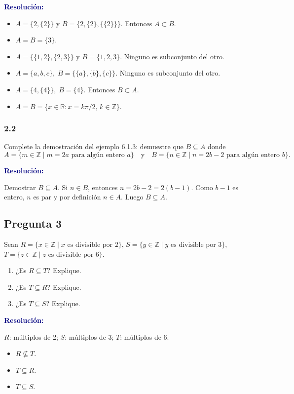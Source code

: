 \documentclass[12pt,a4paper]{article}
\newcommand{\resolucion}{\par\noindent\textbf{\textcolor{navy}{Resolución:}}\par}
\begin{document}
\resolucion
\begin{itemize}[leftmargin=1.2em]
  \item[a)] $A=\{2,\{2\}\}$ y $B=\{2,\{2\},\{\{2\}\}\}$. Entonces $A \subset B$.
  \item[b)] $A=B=\{3\}$.
  \item[c)] $A=\{\{1,2\},\{2,3\}\}$ y $B=\{1,2,3\}$. Ninguno es subconjunto del otro.
  \item[d)] $A=\{a,b,c\},\; B=\{\{a\},\{b\},\{c\}\}$. Ninguno es subconjunto del otro.
  \item[e)] $A=\{4,\{4\}\},\; B=\{4\}$. Entonces $B \subset A$.
  \item[f)] $A=B=\{x\in\mathbb{R}: x=k\pi/2,\,k\in\mathbb{Z}\}$.
\end{itemize}

\subsubsection*{2.2}
Complete la demostración del ejemplo 6.1.3: demuestre que $B \subseteq A$ donde
\[
  A=\{m\in\mathbb{Z}\mid m=2a\text{ para algún entero }a\}\quad\text{y}\quad
  B=\{n\in\mathbb{Z}\mid n=2b-2\text{ para algún entero }b\}.
\]
\resolucion
Demostrar $B \subseteq A$. Si $n\in B$, entonces $n=2b-2=2(b-1)$. Como $b-1$ es entero, $n$ es par y por definición $n\in A$. Luego $B\subseteq A$.

\subsection*{\textcolor{accent}{Pregunta 3}}
Sean $R=\{x\in\mathbb{Z}\mid x\text{ es divisible por }2\}$, $S=\{y\in\mathbb{Z}\mid y\text{ es divisible por }3\}$, $T=\{z\in\mathbb{Z}\mid z\text{ es divisible por }6\}$.
\begin{enumerate}[label=\alph*.]
  \item ¿Es $R \subseteq T$? Explique.
  \item ¿Es $T \subseteq R$? Explique.
  \item ¿Es $T \subseteq S$? Explique.
\end{enumerate}
\resolucion $R$: múltiplos de 2; $S$: múltiplos de 3; $T$: múltiplos de 6.
\begin{itemize}
  \item[a)] $R \not\subseteq T$.
  \item[b)] $T \subseteq R$.
  \item[c)] $T \subseteq S$.
\end{itemize}
\end{document}
